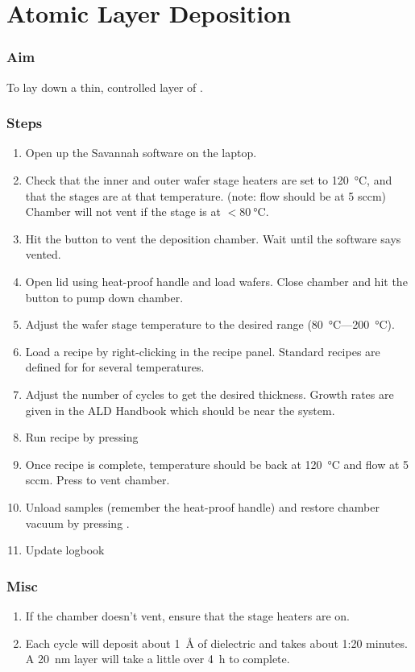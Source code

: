 \section{Atomic Layer Deposition}
\subsubsection{Aim}
To lay down a thin, controlled layer of .

\subsubsection{Steps}
\begin{enumerate}
\item Open up the Savannah software on the laptop.
\item Check that the inner and outer wafer stage heaters are set to \SI{120}{\degreeCelsius}, and that the stages
are at that temperature. (note:  flow should be at 5 sccm) Chamber will not vent if the stage is at $<\SI{80}{\degreeCelsius}$.
\item Hit the  button to vent the deposition chamber. Wait until the software says vented.
\item Open lid using heat-proof handle and load wafers. Close chamber and hit the  button to pump down chamber.
\item Adjust the wafer stage temperature to the desired range (\SI{80}{\degreeCelsius}---\SI{200}{\degreeCelsius}).
\item Load a recipe by right-clicking in the recipe panel. Standard recipes are defined for  for several temperatures.
\item Adjust the number of cycles to get the desired thickness. Growth rates are given in the ALD Handbook which should be near the system.
\item Run recipe by pressing 
\item Once recipe is complete, temperature should be back at \SI{120}{\degreeCelsius} and  flow at 5 sccm. Press  to vent chamber.
\item Unload samples (remember the heat-proof handle) and restore chamber vacuum by pressing .
\item Update logbook
\end{enumerate}

\subsubsection{Misc}
\begin{enumerate}
\item If the chamber doesn't vent, ensure that the stage heaters are on.
\item Each cycle will deposit about \SI{1}{\angstrom} of dielectric and takes about 1:20 minutes. A \SI{20}{\nano\meter} layer
will take a little over \SI{4}{\hour} to complete.
\end{enumerate}
\newpage

